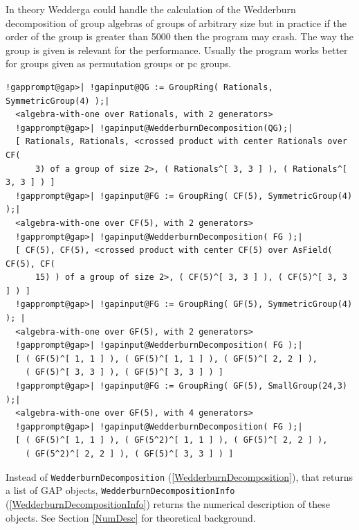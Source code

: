 \documentclass[a4paper,11pt]{report}
\begin{document}
{{ In theory \textsf{Wedderga} could handle the calculation of the Wedderburn decomposition of group algebras
of groups of arbitrary size but in practice if the order of the group is
greater than 5000 then the program may crash. The way the group is given is
relevant for the performance. Usually the program works better for groups
given as permutation groups or pc groups. \newpage 
\begin{Verbatim}[commandchars=!@|,fontsize=\small,frame=single,label=Example]
  !gapprompt@gap>| !gapinput@QG := GroupRing( Rationals, SymmetricGroup(4) );|
  <algebra-with-one over Rationals, with 2 generators>
  !gapprompt@gap>| !gapinput@WedderburnDecomposition(QG);|
  [ Rationals, Rationals, <crossed product with center Rationals over CF(
      3) of a group of size 2>, ( Rationals^[ 3, 3 ] ), ( Rationals^[ 3, 3 ] ) ]
  !gapprompt@gap>| !gapinput@FG := GroupRing( CF(5), SymmetricGroup(4) );|
  <algebra-with-one over CF(5), with 2 generators>
  !gapprompt@gap>| !gapinput@WedderburnDecomposition( FG );|
  [ CF(5), CF(5), <crossed product with center CF(5) over AsField( CF(5), CF(
      15) ) of a group of size 2>, ( CF(5)^[ 3, 3 ] ), ( CF(5)^[ 3, 3 ] ) ]
  !gapprompt@gap>| !gapinput@FG := GroupRing( GF(5), SymmetricGroup(4) ); |
  <algebra-with-one over GF(5), with 2 generators>
  !gapprompt@gap>| !gapinput@WedderburnDecomposition( FG );|
  [ ( GF(5)^[ 1, 1 ] ), ( GF(5)^[ 1, 1 ] ), ( GF(5)^[ 2, 2 ] ), 
    ( GF(5)^[ 3, 3 ] ), ( GF(5)^[ 3, 3 ] ) ]
  !gapprompt@gap>| !gapinput@FG := GroupRing( GF(5), SmallGroup(24,3) );|
  <algebra-with-one over GF(5), with 4 generators>
  !gapprompt@gap>| !gapinput@WedderburnDecomposition( FG );|
  [ ( GF(5)^[ 1, 1 ] ), ( GF(5^2)^[ 1, 1 ] ), ( GF(5)^[ 2, 2 ] ), 
    ( GF(5^2)^[ 2, 2 ] ), ( GF(5)^[ 3, 3 ] ) ]
\end{Verbatim}
 Instead of \texttt{WedderburnDecomposition} (\ref{WedderburnDecomposition}), that returns a list of \textsf{GAP} objects, \texttt{WedderburnDecompositionInfo} (\ref{WedderburnDecompositionInfo}) returns the numerical description of these objects. See Section \ref{NumDesc} for theoretical background. }

 }

  
\end{document}
